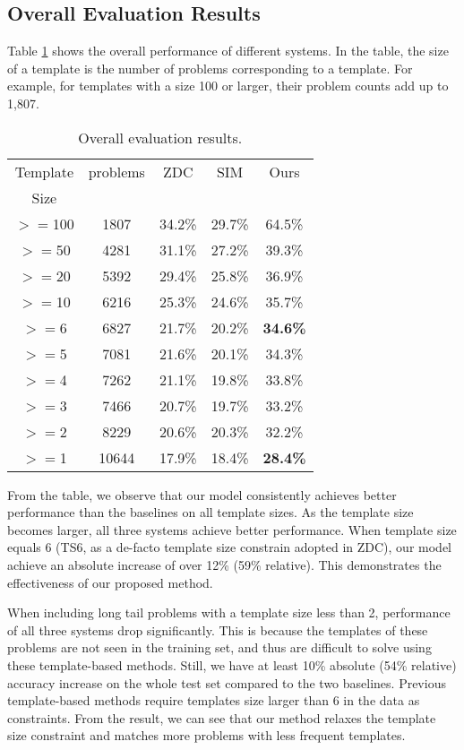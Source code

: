 \documentclass[11pt,letterpaper]{article}
\begin{document}
\subsection{Overall Evaluation Results}
Table \ref{tbl:gradientacc} shows the overall performance of different systems. In the table, the size of a template is the number of problems corresponding to a template. For example, for templates with a size 100 or larger, their problem counts add up to 1,807.\\
\begin{table}[htb]
\begin{center}
	\begin{tabular}{c|c|c|c|c}
        \hline
		Template & problems  & ZDC & SIM & Ours\\
         Size    &           &     &     &     \\
        \hline
		$>=$100 & 1807 & 34.2\% & 29.7\% & 64.5\% \\
		$>=$50 & 4281 & 31.1\% & 27.2\% & 39.3\% \\
		$>=$20 & 5392 & 29.4\% & 25.8\% & 36.9\% \\
		$>=$10 & 6216 & 25.3\% & 24.6\% & 35.7\% \\
		$>=$6 & 6827 & 21.7\% & 20.2\% & \textbf{34.6\%} \\
        \hdashline
		$>=$5 & 7081 & 21.6\% & 20.1\% & 34.3\% \\
		$>=$4 & 7262 & 21.1\% & 19.8\% & 33.8\% \\
		$>=$3 & 7466 & 20.7\% & 19.7\% & 33.2\% \\
		$>=$2 & 8229 & 20.6\% & 20.3\% & 32.2\% \\
		$>=$1 & 10644 & 17.9\% & 18.4\% & \textbf{28.4\%} \\
		\hline
	\end{tabular}
\end{center}
	\caption{Overall evaluation results.}\label{tbl:gradientacc}
\end{table}

From the table, we observe that our model consistently achieves better performance than the baselines on all template sizes. As the template size becomes larger, all three systems achieve better performance. When template size equals 6 (TS6, as a de-facto template size constrain adopted in ZDC), our model achieve an absolute increase of over 12\% (59\% relative). This demonstrates the effectiveness of our proposed method.

When including long tail problems with a template size less than 2, performance of all three systems drop significantly. This is because the templates of these problems are not seen in the training set, and thus are difficult to solve using these template-based methods. Still, we have at least 10\% absolute (54\% relative) accuracy increase on the whole test set compared to the two baselines. Previous template-based methods require templates size larger than 6 in the data as constraints. From the result, we can see that our method relaxes the template size constraint and matches more problems with less frequent templates.
\end{document}
